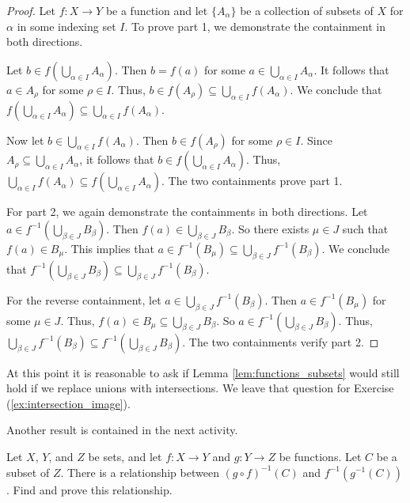 \begin{proof} Let $f : X \to Y$ be a function and let $\{A_{\alpha}\}$ be a collection of subsets of $X$ for $\alpha$ in some indexing set $I$. To prove part 1, we demonstrate the containment in both directions. 

Let $b \in f\left(\bigcup_{\alpha \in I} A_{\alpha}\right)$. Then $b = f(a)$ for some $a \in \bigcup_{\alpha \in I} A_{\alpha}$. It follows that $a \in A_{\rho}$ for some $\rho \in I$. Thus, $b \in f(A_{\rho}) \subseteq \bigcup_{\alpha \in I} f(A_{\alpha})$. We conclude that $f\left(\bigcup_{\alpha \in I} A_{\alpha}\right) \subseteq \bigcup_{\alpha \in I} f(A_{\alpha})$. 

Now let $b \in \bigcup_{\alpha \in I} f(A_{\alpha})$. Then $b \in f(A_{\rho})$ for some $\rho \in I$. Since $A_{\rho} \subseteq \bigcup_{\alpha \in I} A_{\alpha}$, it follows that $b \in f\left(\bigcup_{\alpha \in I} A_{\alpha}\right)$. Thus, $\bigcup_{\alpha \in I} f(A_{\alpha}) \subseteq f\left(\bigcup_{\alpha \in I} A_{\alpha}\right)$. The two containments prove part 1.

For part 2, we again demonstrate the containments in both directions. Let $a \in f^{-1}\left(\bigcup_{\beta \in J} B_{\beta}\right)$. Then $f(a) \in \bigcup_{\beta \in J} B_{\beta}$. So there exists $\mu \in J$ such that $f(a) \in B_{\mu}$. This implies that $a \in f^{-1}(B_{\mu}) \subseteq \bigcup_{\beta \in J} f^{-1}(B_{\beta})$. We conclude that $f^{-1}\left(\bigcup_{\beta \in J} B_{\beta}\right) \subseteq \bigcup_{\beta \in J} f^{-1}(B_{\beta})$. 

For the reverse containment, let $a \in \bigcup_{\beta \in J} f^{-1}(B_{\beta})$. Then $a \in f^{-1}(B_{\mu})$ for some $\mu \in J$. Thus, $f(a) \in B_{\mu} \subseteq \bigcup_{\beta \in J} B_{\beta}$.  So $a \in f^{-1}\left(\bigcup_{\beta \in J} B_{\beta}\right)$. Thus, $\bigcup_{\beta \in J} f^{-1}(B_{\beta}) \subseteq f^{-1}\left(\bigcup_{\beta \in J} B_{\beta}\right)$. The two containments verify part 2. 
\end{proof}

At this point it is reasonable to ask if Lemma \ref{lem:functions_subsets} would still hold if we replace unions with intersections. We leave that question for Exercise (\ref{ex:intersection_image}). 

Another result is contained in the next activity.

\begin{activity} Let $X$, $Y$, and $Z$ be sets, and let $f: X \to Y$ and $g: Y \to Z$ be functions. Let $C$ be a subset of $Z$. There is a relationship between $(g \circ f)^{-1}(C)$ and $f^{-1}(g^{-1}(C))$. Find and prove this relationship.

\end{activity}

